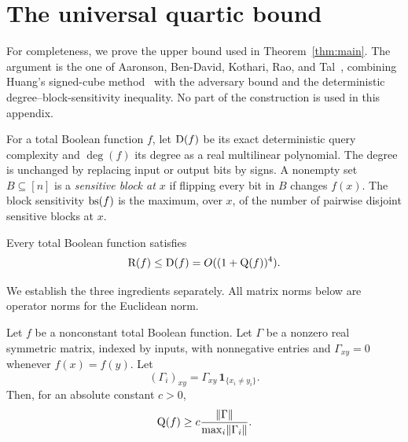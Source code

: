 \section{The universal quartic bound}\label{sec:upper}

For completeness, we prove the upper bound used in
Theorem~\ref{thm:main}. The argument is the one of Aaronson, Ben-David,
Kothari, Rao, and Tal~\cite{ABKRT21}, combining Huang's signed-cube
method~\cite{Huang19} with the adversary bound and the deterministic
degree--block-sensitivity inequality. No part of the construction is
used in this appendix.

For a total Boolean function $f$, let $\mathrm D(f)$ be its exact deterministic
query complexity and $\deg(f)$ its degree as a real multilinear polynomial.
The degree is unchanged by replacing input or output bits by signs.
A nonempty set $B\subseteq[n]$ is a \emph{sensitive block at $x$} if
flipping every bit in $B$ changes $f(x)$. The block sensitivity $\operatorname{bs}(f)$
is the maximum, over $x$, of the number of pairwise disjoint sensitive
blocks at $x$.

\begin{theorem}\label{thm:quartic-upper}
Every total Boolean function satisfies
\[
 \mathrm R(f)\le\mathrm D(f)=O((1+\mathrm Q(f))^4).
\]
\end{theorem}

We establish the three ingredients separately. All matrix norms below
are operator norms for the Euclidean norm.

\begin{lemma}
\label{lem:adversary}
Let $f$ be a nonconstant total Boolean function. Let $\Gamma$ be a nonzero
real symmetric matrix, indexed by inputs, with nonnegative entries and
$\Gamma_{xy}=0$ whenever $f(x)=f(y)$. Let
\[
 (\Gamma_i)_{xy}=\Gamma_{xy}\,\mathbf1_{\{x_i\ne y_i\}}.
\]
Then, for an absolute constant $c>0$,
\[
 \mathrm Q(f)\ge c\frac{\lVert\Gamma\rVert}{\max_i\lVert\Gamma_i\rVert}.
\]
\end{lemma}


